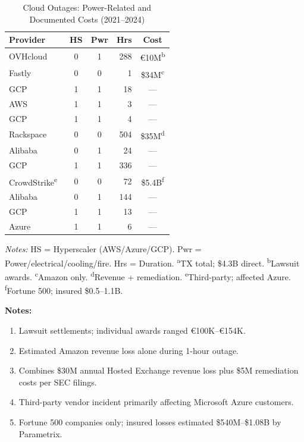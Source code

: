 \documentclass[a4paper,fleqn,longmktitle]{cas-sc}
\begin{document}
\begin{table}[t]
\centering
\scriptsize
\caption{Cloud Outages: Power-Related and Documented Costs (2021--2024)}\label{tab:outages}
\begin{tabular}{@{}lccrc@{}}
\toprule
Provider & HS & Pwr & Hrs & Cost \\
\midrule
OVHcloud~\cite{uptime2021ovh} & 0 & 1 & 288 & \euro10M\textsuperscript{b} \\
Fastly~\cite{fastly2021postmortem} & 0 & 0 & 1 & \$34M\textsuperscript{c} \\
GCP~\cite{dcd2022gcplondon} & 1 & 1 & 18 & --- \\
AWS~\cite{aws2022useast2} & 1 & 1 & 3 & --- \\
GCP~\cite{dck2022gcpiowa} & 1 & 1 & 4 & --- \\
Rackspace~\cite{rackspace2023sec} & 0 & 0 & 504 & \$35M\textsuperscript{d} \\
Alibaba~\cite{scmp2022alibaba} & 0 & 1 & 24 & --- \\
GCP~\cite{register2023gcpparis} & 1 & 1 & 336 & --- \\
CrowdStrike\textsuperscript{e}~\cite{parametrix2024crowdstrike} & 0 & 0 & 72 & \$5.4B\textsuperscript{f} \\
Alibaba~\cite{dcd2024alibabafire} & 0 & 1 & 144 & --- \\
GCP~\cite{register2024gcpfrankfurt} & 1 & 1 & 13 & --- \\
Azure~\cite{statusgator2024azure} & 1 & 1 & 6 & --- \\
\bottomrule
\end{tabular}

\vspace{0.3em}
\raggedright
\tiny
\textit{Notes:} HS = Hyperscaler (AWS/Azure/GCP). Pwr = Power/electrical/cooling/fire. Hrs = Duration.
\textsuperscript{a}TX total; \$4.3B direct.
\textsuperscript{b}Lawsuit awards.
\textsuperscript{c}Amazon only.
\textsuperscript{d}Revenue + remediation.
\textsuperscript{e}Third-party; affected Azure.
\textsuperscript{f}Fortune 500; insured \$0.5--1.1B.
\end{table}

\vspace{1em}
\noindent\textbf{Notes:}
\begin{enumerate}
    \item[b.] Lawsuit settlements; individual awards ranged \euro100K--\euro154K.
    \item[c.] Estimated Amazon revenue loss alone during 1-hour outage.
    \item[d.] Combines \$30M annual Hosted Exchange revenue loss plus \$5M remediation costs per SEC filings.
    \item[e.] Third-party vendor incident primarily affecting Microsoft Azure customers.
    \item[f.] Fortune 500 companies only; insured losses estimated \$540M--\$1.08B by Parametrix.
\end{enumerate}
\end{document}
